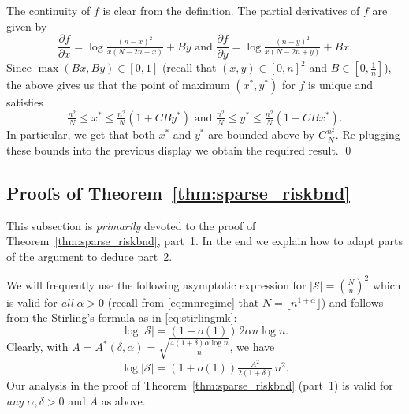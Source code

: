 \documentclass[11pt,reqno,letterpaper]{amsart}
\numberwithin{equation}{section}
\theoremstyle{plain}
\begin{document}
 The continuity of $f$ is clear from the definition. The partial derivatives of $f$ 
are given by
\begin{equation*}
\frac{\partial f}{\partial x} = \log\tfrac{(n-x)^2}{x(N - 2n + x)} + By \mbox{ and } \frac{\partial f}{\partial y} = \log\tfrac{(n-y)^2}{x(N - 2n + y)} + Bx.
\end{equation*}
Since $\max(Bx, By) \in [0, 1]$ (recall that $(x, y) \in [0, n]^2$ and $B \in [0, 
\frac1n]$), the above gives us that the point of maximum $(x^\ast, y^\ast)$ for 
$f$ is unique and satisfies
\begin{equation*}
\tfrac{n^2}N \le x^\ast  \le \tfrac{n^2}N(1 + C By^\ast) \mbox{ and } \tfrac{n^2}N \le y^\ast  \le \tfrac{n^2}N(1 + C Bx^\ast).
\end{equation*}
In particular, we get that both $x^\ast$ and $y^\ast$ are bounded above by 
$C\tfrac{n^2}N$. Re-plugging these bounds into the previous display we obtain the 
required result. \qed

\subsection{Proofs of Theorem~\ref{thm:sparse_riskbnd}}\label{subsec:sparse}
This subsection is {\em primarily} devoted to the proof of 
Theorem~\ref{thm:sparse_riskbnd}, part~1. In the end we explain how to adapt parts 
of the argument to deduce part~2.

\smallskip

 We will frequently use the following asymptotic expression for $|\mathcal S| = {\binom{N}
{n}}^2$ which is valid for {\em all} $\alpha > 0$ (recall from \eqref{eq:mnregime} that $N = \lfloor n^{1 + \alpha} \rfloor$) and follows from the Stirling's formula as in \eqref{eq:stirlingmk}:
\begin{equation}\label{eq:Scardinality}
\log |\mathcal S| = (1 + o(1)) \, 2\alpha n \log n.
\end{equation}
Clearly, with $A = A^\ast(\delta, \alpha) = \sqrt{\frac{4(1+\delta)\alpha \log n}{n}}$, we have
\begin{equation}\label{eq:mathcalSA}
\log |\mathcal S| = 
(1 + o(1)) \tfrac{A^2}{2(1 + \delta)} \, n^2.
\end{equation}
Our analysis in the proof of Theorem~\ref{thm:sparse_riskbnd} (part~1) is valid for {\em any} $\alpha, \delta > 0$ and $A$ as above.


\smallskip
\end{document}
